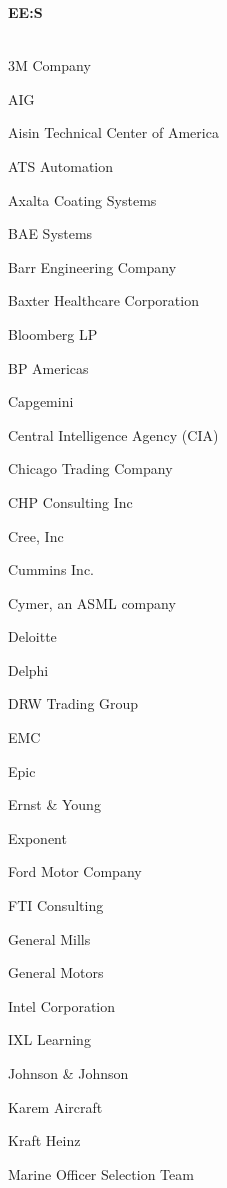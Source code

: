 \documentclass[twoside]{article}
\begin{document}
\begin{center}
\begin{multicols}{5}
\begin{FlushLeft}
\begin{compactitem}
\end{compactitem}
        \end{FlushLeft}
        \vspace{1em}
        {\fontsize{14}{16}\selectfont \bf EE:S}\\
        \vspace{-1em}
        ~\hrulefill~
        \vspace{-.9em}
        \begin{FlushLeft}
        \begin{compactitem}
        \item 3M Company
\item AIG
\item Aisin Technical Center of America
\item ATS Automation
\item Axalta Coating Systems
\item BAE Systems
\item Barr Engineering Company
\item Baxter Healthcare Corporation
\item Bloomberg LP
\item BP Americas
\item Capgemini
\item Central Intelligence Agency (CIA)
\item Chicago Trading Company
\item CHP Consulting Inc
\item Cree, Inc
\item Cummins Inc.
\item Cymer, an ASML company
\item Deloitte
\item Delphi
\item DRW Trading Group
\item EMC
\item Epic
\item Ernst \& Young
\item Exponent
\item Ford Motor Company
\item FTI Consulting
\item General Mills
\item General Motors
\item Intel Corporation
\item IXL Learning
\item Johnson \& Johnson
\item Karem Aircraft
\item Kraft Heinz
\item Marine Officer Selection Team

\end{compactitem}
\end{FlushLeft}
\end{multicols}
\end{center}
\end{document}
